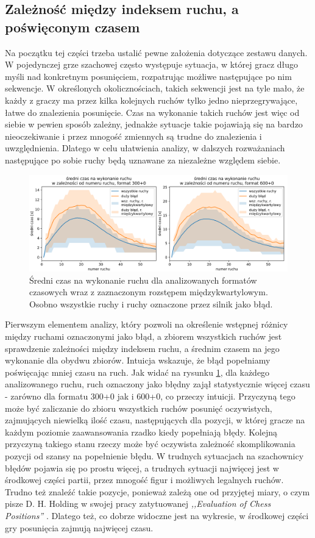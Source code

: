 \documentclass[inzynierska]{pwr_wmat_praca_dyplomowa}
\theoremstyle{plain}
\numberwithin{theorem}{chapter}
\theoremstyle{definition}
\numberwithin{theorem}{chapter}
\begin{document}
\subsection{Zależność między indeksem ruchu, a poświęconym czasem}


Na początku tej części trzeba ustalić pewne założenia dotyczące zestawu danych. W pojedynczej grze szachowej często występuje sytuacja, w której gracz długo myśli nad konkretnym posunięciem, rozpatrując możliwe następujące po nim sekwencje. W określonych okolicznościach, takich sekwencji jest na tyle mało, że każdy z graczy ma przez kilka kolejnych ruchów tylko jedno nieprzegrywające, łatwe do znalezienia posunięcie. Czas na wykonanie takich ruchów jest więc od siebie w pewien sposób zależny, jednakże sytuacje takie pojawiają się na bardzo nieoczekiwanie i przez mnogość zmiennych są trudne do znalezienia i uwzględnienia. Dlatego w celu ułatwienia analizy, w dalszych rozważaniach następujące po sobie ruchy będą uznawane za niezależne względem siebie.
\begin{figure}[H]
	\centering
	\includegraphics[width=\textwidth]{sr_czas_na_ruch.png}
	\caption{Średni czas na wykonanie ruchu dla analizowanych formatów czasowych wraz z zaznaczonym rozstępem międzykwartylowym. Osobno wszystkie ruchy i ruchy oznaczone przez silnik jako błąd.}
	\label{rys:sr_czas_na_ruch}
\end{figure}

Pierwszym elementem analizy, który pozwoli na określenie wstępnej różnicy między ruchami oznaczonymi jako błąd, a zbiorem wszystkich ruchów jest sprawdzenie zależności między indeksem ruchu, a średnim czasem na jego wykonanie dla obydwu zbiorów. Intuicja wskazuje, że błąd popełniamy poświęcając mniej czasu na ruch. Jak widać na rysunku \ref{rys:sr_czas_na_ruch}, dla każdego analizowanego ruchu, ruch oznaczony jako błędny zajął statystycznie więcej czasu - zarówno dla formatu 300+0 jak i 600+0, co przeczy intuicji. 
Przyczyną tego może być zaliczanie do zbioru wszystkich ruchów posunięć oczywistych, zajmujących niewielką ilość czasu, następujących dla pozycji, w której gracze na każdym poziomie zaawansowania rzadko kiedy popełniają błędy.
Kolejną przyczyną takiego stanu rzeczy może być oczywista zależność skomplikowania pozycji od szansy na popełnienie błędu. W trudnych sytuacjach na szachownicy błędów pojawia się po prostu więcej, a trudnych sytuacji najwięcej jest w środkowej części partii, przez mnogość figur i możliwych legalnych ruchów. Trudno też znaleźć takie pozycje, ponieważ zależą one od przyjętej miary, o czym pisze D. H. Holding w swojej pracy zatytuowanej \textit{,,Evaluation of Chess Positions''} \cite{Holding1979TheEO}.  Dlatego też, co dobrze widoczne jest na wykresie, w środkowej części gry posunięcia zajmują najwięcej czasu.
\end{document}
